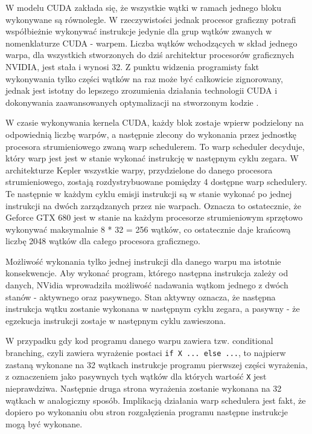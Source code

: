W modelu CUDA zakłada się, że wszystkie wątki w ramach jednego bloku wykonywane
są równolegle. W rzeczywistości jednak procesor graficzny potrafi współbieżnie
wykonywać instrukcje jedynie dla grup wątków zwanych w nomenklaturze CUDA -
warpem.  Liczba wątków wchodzących w skład jednego warpa, dla wszystkich
stworzonych do dziś architektur procesorów graficznych NVIDIA, jest stała i
wynosi 32. Z punktu widzenia programisty fakt wykonywania tylko części wątków na
raz może być całkowicie zignorowany, jednak jest istotny do lepszego zrozumienia
działania technologii CUDA i dokonywania zaawansowanych optymalizacji na stworzonym
kodzie \cite{kepler}.

W czasie wykonywania kernela CUDA, każdy blok zostaje wpierw podzielony na
odpowiednią liczbę warpów, a następnie zlecony do wykonania przez jednostkę
procesora strumieniowego zwaną warp schedulerem. To warp scheduler decyduje, który warp jest 
jest w stanie wykonać instrukcję w następnym cyklu zegara. W architekturze
Kepler wszystkie warpy, przydzielone do danego procesora strumieniowego,
zostają rozdystrybuowane pomiędzy 4 dostępne warp schedulery. Te następnie w
każdym cyklu emisji instrukcji są w stanie wykonać po jednej instrukcji na
dwóch zarządzanych przez nie warpach. Oznacza to ostatecznie, że Geforce GTX 680
jest w stanie na każdym procesorze strumieniowym sprzętowo wykonywać maksymalnie 8 * 32 =
256 wątków, co ostatecznie daje krańcową liczbę 2048 wątków dla całego procesora
graficznego.

Możliwość wykonania tylko jednej instrukcji dla danego warpu ma istotnie
konsekwencje. Aby wykonać program, którego następna instrukcja
zależy od danych, NVidia wprowadziła możliwość nadawania wątkom jednego z dwóch stanów -
aktywnego oraz pasywnego. Stan aktywny oznacza, że następna instrukcja wątku
zostanie wykonana w następnym cyklu zegara, a pasywny - że egzekucja instrukcji
zostaje w następnym cyklu zawieszona.

W przypadku gdy kod programu danego warpu zawiera tzw. conditional branching,
  czyli zawiera wyrażenie postaci \texttt{if X {...} else {...}}, to najpierw
  zastaną wykonane na 32 wątkach instrukcje programu pierwszej części wyrażenia,
  z oznaczeniem jako pasywnych tych wątków dla których wartość \texttt{X} jest
  nieprawdziwa. Następnie druga strona wyrażenia zostanie wykonana na 32 wątkach
  w analogiczny sposób. Implikacją działania warp schedulera jest fakt, że
  dopiero po wykonaniu obu stron rozgałęzienia programu następne instrukcje mogą
  być wykonane. 
  
